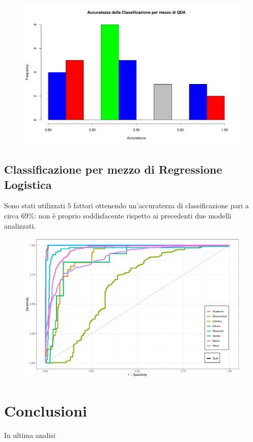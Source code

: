 \documentclass[11pt,a4paper]{article}
\begin{document}
\begin{figure}[H]
	\hspace{-2.5cm}
	\includegraphics[scale=.75]{imgs/QDA_hist.pdf}
\end{figure}

\subsection{Classificazione per mezzo di Regressione Logistica}
Sono stati utilizzati $5$ fattori ottenendo un'accuratezza di classificazione
pari a circa $69\%$: non \`e proprio soddisfacente rispetto ai precedenti due
modelli analizzati.
\begin{figure}[H]
	\hspace{-2.5cm}
	\includegraphics[scale=.75]{imgs/GLM_ggplot.pdf}
\end{figure}

\section{Conclusioni}
In ultima analisi
\end{document}
